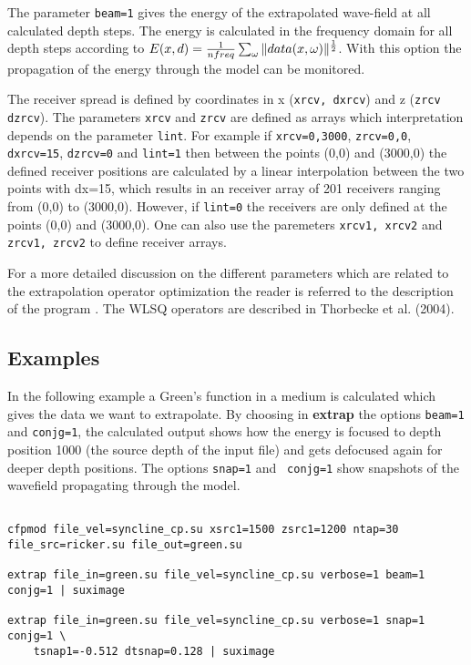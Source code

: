 The parameter {\tt beam=1} gives the energy of the extrapolated wave-field at all calculated depth steps. The energy is calculated in the frequency domain for all depth steps according to $E(x,d) = {1 \over nfreq} \sum_{\omega} \|data(x, \omega)\|^{1 \over 2}$. With this option the propagation of the energy through the model can be monitored. 

The receiver spread is defined by coordinates in x ({\tt xrcv, dxrcv}) and z ({\tt zrcv dzrcv}). The parameters {\tt xrcv} and {\tt zrcv} are defined as arrays which interpretation depends on the parameter {\tt lint}. For example if {\tt xrcv=0,3000}, {\tt zrcv=0,0}, {\tt dxrcv=15}, {\tt dzrcv=0} and {\tt lint=1} then between the points (0,0) and (3000,0) the defined receiver positions are calculated by a linear interpolation between the two points with dx=15, which results in an receiver array of 201 receivers ranging from (0,0) to (3000,0). However, if {\tt lint=0} the receivers are only defined at the points (0,0) and (3000,0). One can also use the paremeters {\tt xrcv1, xrcv2} and {\tt zrcv1, zrcv2} to define receiver arrays.

For a more detailed discussion on the different parameters which are related to the extrapolation operator optimization the reader is referred to the description of the program . The WLSQ operators are described in Thorbecke et al. (2004).

\subsection{Examples}

In the following example a Green's function in a medium is calculated which gives the data we want to extrapolate. By choosing in
{\bf extrap} the options {\tt beam=1} and {\tt conjg=1}, the calculated output shows how the energy is focused to depth position
1000 (the source depth of the input file) and gets defocused again for deeper depth positions. The options {\tt snap=1} and {\tt
conjg=1} show snapshots of the wavefield propagating through the model.  

{\footnotesize
\begin{verbatim}

cfpmod file_vel=syncline_cp.su xsrc1=1500 zsrc1=1200 ntap=30 file_src=ricker.su file_out=green.su

extrap file_in=green.su file_vel=syncline_cp.su verbose=1 beam=1 conjg=1 | suximage 

extrap file_in=green.su file_vel=syncline_cp.su verbose=1 snap=1 conjg=1 \
	tsnap1=-0.512 dtsnap=0.128 | suximage 

\end{verbatim}}

